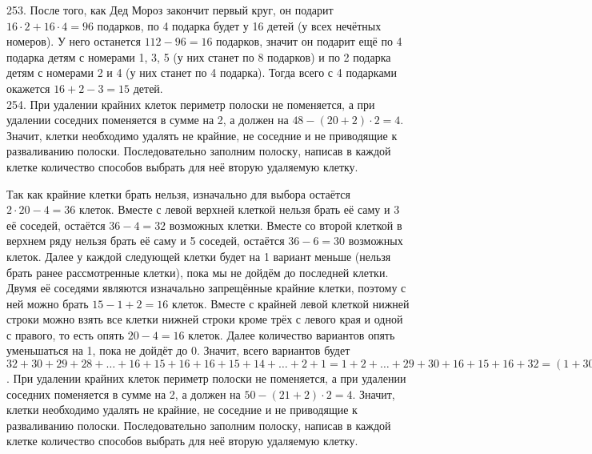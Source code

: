 253. После того, как Дед Мороз закончит первый круг, он подарит $16\cdot2+16\cdot4=96$ подарков, по 4 подарка будет у 16 детей (у всех нечётных номеров). У него останется $112-96=16$ подарков, значит он подарит ещё по 4 подарка детям с номерами 1, 3, 5 (у них станет по 8 подарков) и по 2 подарка детям с номерами 2 и 4 (у них станет по 4 подарка). Тогда всего с 4 подарками окажется $16+2-3=15$ детей.\\
254. При удалении крайних клеток периметр полоски не поменяется, а при удалении соседних поменяется в сумме на 2, а должен на $48-(20+2)\cdot2=4.$ Значит, клетки необходимо удалять не крайние, не соседние и не приводящие к разваливанию полоски. Последовательно заполним полоску, написав в каждой клетке количество способов выбрать для неё вторую удаляемую клетку.
\begin{center}
\begin{figure}[ht!]
\end{figure}
\end{center}
Так как крайние клетки брать нельзя, изначально для выбора остаётся $2\cdot20-4=36$ клеток. Вместе с левой верхней клеткой нельзя брать её саму и 3 её соседей, остаётся $36-4=32$ возможных клетки. Вместе со второй клеткой в верхнем ряду нельзя брать её саму и 5 соседей, остаётся $36-6=30$ возможных клеток. Далее у каждой следующей клетки будет на 1 вариант меньше (нельзя брать ранее рассмотренные клетки), пока мы не дойдём до последней клетки. Двумя её соседями являются изначально запрещённые крайние клетки, поэтому с ней можно брать $15-1+2=16$ клеток. Вместе с крайней левой клеткой нижней строки можно взять все клетки нижней строки кроме трёх с левого края и одной с правого, то есть опять $20-4=16$ клеток. Далее количество вариантов опять уменьшаться на 1, пока не дойдёт до 0. Значит, всего вариантов будет $32+30+29+28+\ldots+16+15+16+16+15+14+\ldots+2+1=1+2+\ldots+29+30+16+15+16+32=(1+30)+(2+29)+\ldots+(15+16)+79=31\cdot15+79=544.$\newpage{}. При удалении крайних клеток периметр полоски не поменяется, а при удалении соседних поменяется в сумме на 2, а должен на $50-(21+2)\cdot2=4.$ Значит, клетки необходимо удалять не крайние, не соседние и не приводящие к разваливанию полоски. Последовательно заполним полоску, написав в каждой клетке количество способов выбрать для неё вторую удаляемую клетку.
\begin{center}
\begin{figure}[ht!]
\end{figure}
\end{center}
